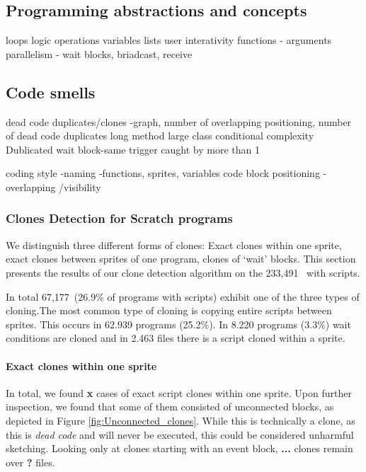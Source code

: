 \documentclass{sig-alternate}
\newcommand{\nScriptPrograms}{233,491}
\newcommand{\nProgramsWithClones}{67,177}
\newcommand{\todo}[1]{\textbf{#1}}
\begin{document}
\subsection{Programming abstractions and concepts}
loops	
logic operations	
variables	
lists	
user interativity	
functions - arguments
parallelism	- wait blocks, briadcast, receive	


\subsection{Code smells}
dead code
duplicates/clones -graph, number of overlapping positioning, number of dead code duplicates
long method
large class
conditional complexity
Dublicated wait block-same trigger caught by more than 1

coding style -naming -functions, sprites, variables
code block positioning - overlapping /visibility

\subsubsection{Clones Detection for Scratch programs}
\label{clone_Detection}

We distinguish three different forms of clones: Exact clones within one sprite, exact clones between sprites of one program, clones of `wait' blocks. This section presents the results of our clone detection algorithm on the \nScriptPrograms~ with scripts.

In total \nProgramsWithClones~(26.9\% of programs with scripts) exhibit one of the three types of cloning.The most common type of cloning is copying entire scripts between sprites. This occurs in 62.939 programs (25.2\%). In 8.220 programs (3.3\%) wait conditions are cloned and in 2.463 files there is a script cloned within a sprite.

\paragraph{Exact clones within one sprite}
In total, we found \todo{x} cases of exact script clones within one sprite. Upon further inspection, we found that some of them consisted of unconnected blocks, as depicted in Figure \ref{fig:Unconnected_clones}. While this is technically a clone, as this is \emph{dead code} and will never be executed, this could be considered unharmful sketching. Looking only at clones starting with an event block, \todo{...} clones remain over \todo{?} files.
\end{document}
